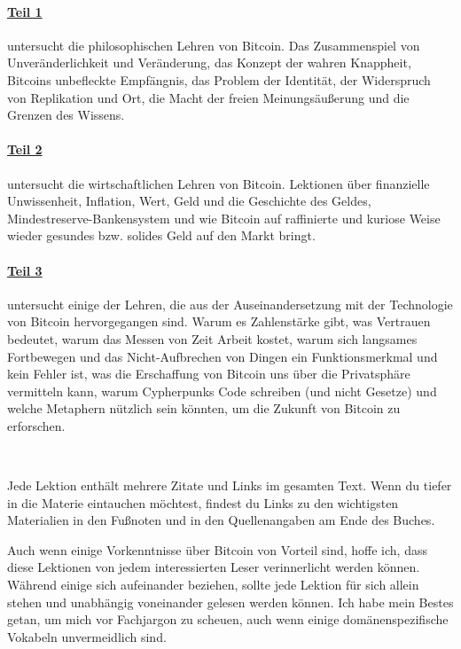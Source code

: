 \paragraph{\hyperref[ch:philosophy]{Teil 1}} untersucht die philosophischen
Lehren von Bitcoin. Das Zusammenspiel von Unveränderlichkeit und Veränderung,
das Konzept der wahren Knappheit, Bitcoins unbefleckte Empfängnis, das Problem
der Identität, der Widerspruch von Replikation und Ort, die Macht der freien
Meinungsäußerung und die Grenzen des Wissens.

\paragraph{\hyperref[ch:economics]{Teil 2}} untersucht die wirtschaftlichen
Lehren von Bitcoin. Lektionen über finanzielle Unwissenheit, Inflation, Wert,
Geld und die Geschichte des Geldes, Mindestreserve-Bankensystem und wie Bitcoin
auf raffinierte und kuriose Weise wieder gesundes bzw. solides Geld auf den
Markt bringt.

\paragraph{\hyperref[ch:technology]{Teil 3}} untersucht einige der Lehren,
die aus der Auseinandersetzung mit der Technologie von Bitcoin hervorgegangen
sind. Warum es Zahlenstärke gibt, was Vertrauen bedeutet, warum das Messen von
Zeit Arbeit kostet, warum sich langsames Fortbewegen und das Nicht-Aufbrechen
von Dingen ein Funktionsmerkmal und kein Fehler ist, was die Erschaffung von
Bitcoin uns über die Privatsphäre vermitteln kann, warum Cypherpunks Code
schreiben (und nicht Gesetze) und welche Metaphern nützlich sein könnten, um die
Zukunft von Bitcoin zu erforschen.

~

Jede Lektion enthält mehrere Zitate und Links im gesamten Text. Wenn du tiefer
in die Materie eintauchen möchtest, findest du Links zu den wichtigsten
Materialien in den Fußnoten und in den Quellenangaben am Ende des Buches.

Auch wenn einige Vorkenntnisse über Bitcoin von Vorteil sind, hoffe ich, dass
diese Lektionen von jedem interessierten Leser verinnerlicht werden können.
Während einige sich aufeinander beziehen, sollte jede Lektion für sich allein
stehen und unabhängig voneinander gelesen werden können. Ich habe mein Bestes
getan, um mich vor Fachjargon zu scheuen, auch wenn einige domänenspezifische
Vokabeln unvermeidlich sind.

